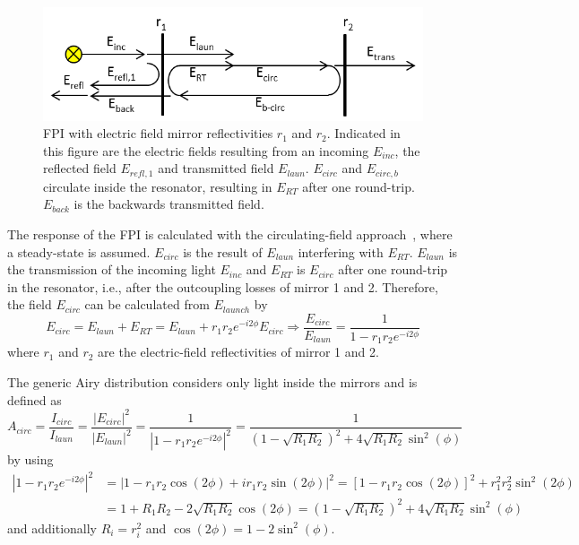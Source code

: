\begin{figure}[h]
	\centering
	\includegraphics[width=0.7\linewidth]{figures/fabry-perot/Schematic_of_the_Fabry-Perot_interferometer}
	\caption[Fabry Pérot interferometer with electric field mirror reflectivities $r_1$ and $r_2$]{\ac{FPI} with electric field mirror reflectivities $r_1$ and $r_2$.
		Indicated in this figure are the electric fields resulting from an incoming $E_{inc}$, the reflected field $E_{refl,1}$ and transmitted field $E_{laun}$.
		$E_{circ}$ and $E_{circ,b}$ circulate inside the resonator, resulting in $E_{RT}$ after one round-trip. $E_{back}$ is the backwards transmitted field.\cite{noauthor_fabryperot_nodate}}
	\label{fig:schematicofthefabry-perotinterferometer}
\end{figure}
The response of the \ac{FPI} is calculated with the circulating-field approach~\cite{ismail_fabry-perot_2016}, where a steady-state is assumed.
$E_{circ}$ is the result of $E_{laun}$ interfering with $E_{RT}$.
$E_{laun}$ is the transmission of the incoming light $E_{inc}$ and $E_{RT}$ is $E_{circ}$ after one round-trip in the resonator, i.e., after the outcoupling losses of mirror 1 and 2.
Therefore, the field $E_{circ}$ can be calculated from $E_{launch}$ by
\begin{equation}
E_{circ} = E_{laun} + E_{RT} = E_{laun} + r_1 r_2 e^{-i 2 \phi} E_{circ} \Rightarrow \frac{E_{circ}}{E_{laun}} = \frac{1}{1 - r_1 r_2 e^{-i 2 \phi}}
\end{equation}
where $r_1$ and $r_2$ are the electric-field reflectivities of mirror 1 and 2.

The generic Airy distribution considers only light inside the mirrors and is defined as
\begin{equation}
A_{circ} = \frac{I_{circ}}{I_{laun}} = \frac{|E_{circ}|^2}{|E_{laun}|^2} = \frac{1}{\left|1 - r_1 r_2 e^{-i2\phi}\right|^2} = \frac{1}{\left(1-\sqrt{R_1 R_2}\right)^2 + 4\sqrt{R_1 R_2} \sin^2(\phi)}
\end{equation}
by using
\begin{align*}
\left|1-r_1 r_2 e^{-i2\phi}\right|^2 &= \left|1- r_1 r_2 \cos(2\phi) + i r_1 r_2 \sin(2\phi)\right|^2 = \left[1-r_1 r_2 \cos(2\phi)\right]^2 + r_1^2 r_2^2 \sin^2(2\phi) \\
 &=1+R_1 R_2 - 2\sqrt{R_1 R_2} \cos(2\phi) = \left(1-\sqrt{R_1 R_2}\right)^2 + 4 \sqrt{R_1 R_2} \sin^2(\phi)
\end{align*}
and additionally $R_i = r_i^2$ and $\cos(2\phi) = 1 -2\sin^2(\phi)$.

